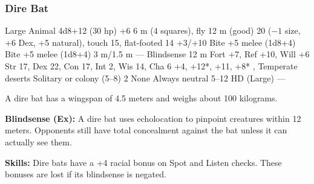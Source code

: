 \subsubsection{Dire Bat}
\begin{MonsterStats}
{Large Animal}
{4d8+12 (30 hp)}
{+6}
{6 m (4 squares), fly 12 m (good)}
{20 ($-1$ size, +6 Dex, +5 natural), touch 15, flat-footed 14}
{+3/+10}
{Bite +5 melee (1d8+4)}
{Bite +5 melee (1d8+4)}
{3 m/1.5 m}
{---}
{Blindsense 12 m}
{Fort +7, Ref +10, Will +6}
{Str 17, Dex 22, Con 17, Int 2, Wis 14, Cha 6}
{ +4,  +12*,  +11,  +8*}
{, }
{Temperate deserts}
{Solitary or colony (5--8)}
{2}
{None}
{Always neutral}
{5--12 HD (Large)}
{---}
\end{MonsterStats}
A dire bat has a wingspan of 4.5 meters and weighs about 100 kilograms.

\textbf{Blindsense (Ex):} A dire bat uses echolocation to pinpoint creatures within 12 meters. Opponents still have total concealment against the bat unless it can actually see them.

\textbf{Skills:} Dire bats have a +4 racial bonus on Spot and Listen checks. These bonuses are lost if its blindsense is negated.

